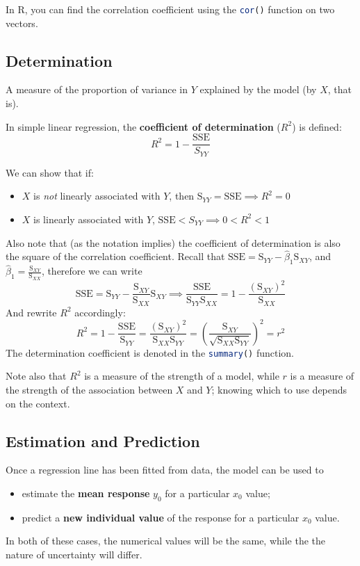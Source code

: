 \documentclass[12pt]{article}
\begin{document}
In R, you can find the correlation coefficient using the \lstinline[language=R]{cor()} function on two vectors.
\subsection{Determination}
\begin{definitionEnd}[Determination]
    A measure of the proportion of variance in $Y$ explained by the model (by $X$, that is).
\end{definitionEnd}

In simple linear regression, the \textbf{coefficient of determination} ($R^2$) is defined:\[R^2 = 1 - \frac{\text{SSE}}{S_{YY}}\]

We can show that if:\begin{itemize}
    \item $X$ is \textit{not} linearly associated with $Y$, then $\text{S}_{YY} = \text{SSE} \implies R^2 = 0$
    \item $X$ is linearly associated with $Y$, $\text{SSE} < S_{YY} \implies 0 < R^2 < 1$
\end{itemize} Also note that (as the notation implies) the coefficient of determination is also the square of the correlation coefficient. Recall that $\text{SSE} = \text{S}_{YY} - \hat{\beta}_1\text{S}_{XY}$, and $\hat{\beta}_1 = \frac{\text{S}_{XY}}{\text{S}_{XX}}$, therefore we can write\[\text{SSE} = \text{S}_{YY} - \frac{\text{S}_{XY}}{\text{S}_{XX}}\text{S}_{XY} \implies \frac{\text{SSE}}{\text{S}_{YY}\text{S}_{XX}} = 1 - \frac{(\text{S}_{XY})^2}{\text{S}_{XX}}\]And rewrite $R^2$ accordingly:\[R^2 = 1 - \frac{\text{SSE}}{\text{S}_{YY}} = \frac{(\text{S}_{XY})^2}{\text{S}_{XX}\text{S}_{{YY}}} = \left(\frac{\text{S}_{XY}}{\sqrt{\text{S}_{XX}\text{S}_{YY}}}\right)^2=r^2\]The determination coefficient is denoted in the \lstinline[language=R]{summary()} function.

Note also that $R^2$ is a measure of the strength of a model, while $r$ is a measure of the strength of the association between $X$ and $Y$; knowing which to use depends on the context.

\subsection{Estimation and Prediction}

Once a regression line has been fitted from data, the model can be used to \begin{itemize}
    \item estimate the \textbf{mean response} $y_0$ for a particular $x_0$ value;
    \item predict a \textbf{new individual value} of the response for a  particular $x_0$ value.
\end{itemize}
In both of these cases, the numerical values will be the same, while the the nature of uncertainty will differ.
\end{document}
